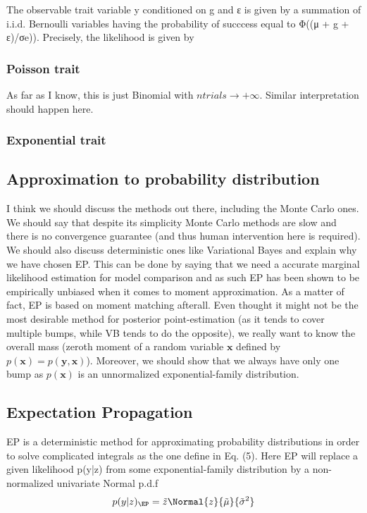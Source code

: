 The observable trait variable y conditioned on g and ε is given by a summation of i.i.d.
Bernoulli variables having the probability of succcess equal to Φ((μ + g + ε)/σe)). Precisely,
the likelihood is given by

\subsubsection{Poisson trait}

As far as I know, this is just Binomial with $ntrials \rightarrow +\infty$. Similar interpretation should happen here.

\subsubsection{Exponential trait}



\subsection{Approximation to probability distribution}

I think we should discuss the methods out there, including the Monte Carlo ones. We should say that despite its simplicity Monte Carlo methods are slow and there is no convergence guarantee (and thus human intervention here is required). We should also discuss deterministic ones like Variational Bayes and explain why we have chosen EP. This can be done by saying that we need a accurate marginal likelihood estimation for model comparison and as such EP has been shown to be empirically unbiased when it comes to moment approximation. As a matter of fact, EP is based on moment matching afterall. Even thought it might not be the most desirable method for posterior point-estimation (as it tends to cover multiple bumps, while VB tends to do the opposite), we really want to know the overall mass (zeroth moment of a random variable $\mathbf x$ defined by $p(\mathbf x) = p(\mathbf y, \mathbf x)$). Moreover, we should show that we always have only one bump as $p(\mathbf x)$ is an unnormalized exponential-family distribution.

\subsection{Expectation Propagation}

EP is a deterministic method for approximating probability distributions in order to solve complicated integrals as the one define in Eq. (5). Here EP will replace a given likelihood p(y|z) from some exponential-family distribution by a non-normalized univariate Normal p.d.f
\begin{align*}
p(y|z)_{\EP} = \tilde z \Normal{z}{\tilde \mu}{\tilde \sigma^2}
\end{align*}

